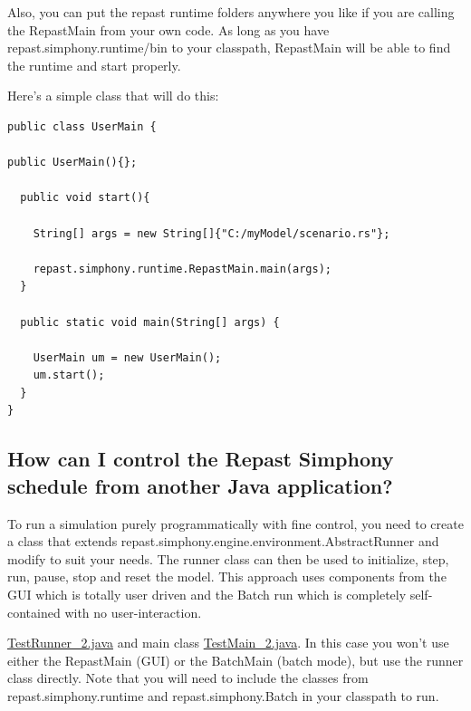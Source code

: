 \documentclass[11pt]{article}
\begin{document}
Also, you can put the repast runtime folders anywhere you like if you are calling the RepastMain from your own code. As long as you have repast.simphony.runtime/bin to your classpath, RepastMain will be able to find the runtime and start properly.

Here's a simple class that will do this:

\noindent\begin{minipage}[h]{\textwidth}
\vspace{.2in}
\lstset{language=java}
\begin{lstlisting}
public class UserMain {

public UserMain(){};

  public void start(){

    String[] args = new String[]{"C:/myModel/scenario.rs"};

    repast.simphony.runtime.RepastMain.main(args);
  }

  public static void main(String[] args) {

    UserMain um = new UserMain();
    um.start();
  }
}
\end{lstlisting}
\vspace{.2in}
\end{minipage}


\subsection{How can I control the Repast Simphony schedule from another Java application?}
\label{prs:schedule_java}
To run a simulation purely programmatically with fine control, you need to create a class that extends repast.simphony.engine.environment.AbstractRunner and modify to suit your needs. The runner class can then be used to initialize, step, run, pause, stop and reset the model. This approach uses components from the GUI which is totally user driven and the Batch run which is completely self-contained with no user-interaction.

\href{https://repast.github.io/docs/TestRunner_2.java}{TestRunner\_2.java} and main class \href{https://repast.github.io/docs/TestMain_2.java}{TestMain\_2.java}. In this case you won't use either the RepastMain (GUI) or the BatchMain (batch mode), but use the runner class directly. Note that you will need to include the classes from repast.simphony.runtime and repast.simphony.Batch in your classpath to run.
\end{document}

